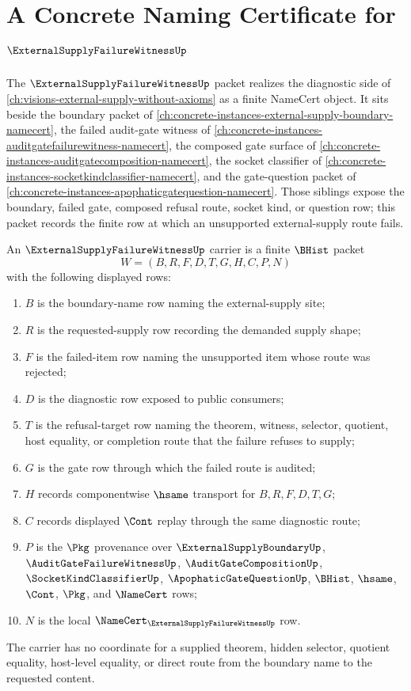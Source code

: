 \chapter{A Concrete Naming Certificate for $\ExternalSupplyFailureWitnessUp$}
\label{ch:concrete-instances-external-supply-failure-witness-namecert}

The $\ExternalSupplyFailureWitnessUp$ packet realizes the diagnostic side of \autoref{ch:visions-external-supply-without-axioms} as a finite NameCert object. It sits beside the boundary packet of \autoref{ch:concrete-instances-external-supply-boundary-namecert}, the failed audit-gate witness of \autoref{ch:concrete-instances-auditgatefailurewitness-namecert}, the composed gate surface of \autoref{ch:concrete-instances-auditgatecomposition-namecert}, the socket classifier of \autoref{ch:concrete-instances-socketkindclassifier-namecert}, and the gate-question packet of \autoref{ch:concrete-instances-apophaticgatequestion-namecert}. Those siblings expose the boundary, failed gate, composed refusal route, socket kind, or question row; this packet records the finite row at which an unsupported external-supply route fails.

\begin{definition}
\label{def:external-supply-failure-witness-carrier}
An $\ExternalSupplyFailureWitnessUp$ carrier is a finite $\BHist$ packet
$$
W=(B,R,F,D,T,G,H,C,P,N)
$$
with the following displayed rows:
\begin{enumerate}
\item $B$ is the boundary-name row naming the external-supply site;
\item $R$ is the requested-supply row recording the demanded supply shape;
\item $F$ is the failed-item row naming the unsupported item whose route was rejected;
\item $D$ is the diagnostic row exposed to public consumers;
\item $T$ is the refusal-target row naming the theorem, witness, selector, quotient, host equality, or completion route that the failure refuses to supply;
\item $G$ is the gate row through which the failed route is audited;
\item $H$ records componentwise $\hsame$ transport for $B,R,F,D,T,G$;
\item $C$ records displayed $\Cont$ replay through the same diagnostic route;
\item $P$ is the $\Pkg$ provenance over $\ExternalSupplyBoundaryUp$, $\AuditGateFailureWitnessUp$, $\AuditGateCompositionUp$, $\SocketKindClassifierUp$, $\ApophaticGateQuestionUp$, $\BHist$, $\hsame$, $\Cont$, $\Pkg$, and $\NameCert$ rows;
\item $N$ is the local $\NameCert_{\ExternalSupplyFailureWitnessUp}$ row.
\end{enumerate}
The carrier has no coordinate for a supplied theorem, hidden selector, quotient equality, host-level equality, or direct route from the boundary name to the requested content.
\end{definition}

